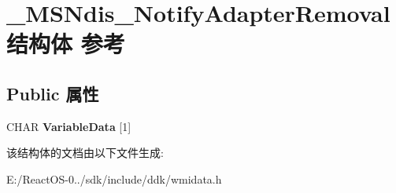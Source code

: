 \hypertarget{struct___m_s_ndis___notify_adapter_removal}{}\section{\+\_\+\+M\+S\+Ndis\+\_\+\+Notify\+Adapter\+Removal结构体 参考}
\label{struct___m_s_ndis___notify_adapter_removal}
\subsection*{Public 属性}
\begin{DoxyCompactItemize}
\item 
\mbox{\label{struct___m_s_ndis___notify_adapter_removal_a6b325f55e8edb812797c90d99340f77b}} 
C\+H\+AR {\bfseries Variable\+Data} \mbox{[}1\mbox{]}
\end{DoxyCompactItemize}


该结构体的文档由以下文件生成\+:\begin{DoxyCompactItemize}
\item 
E\+:/\+React\+O\+S-\/0../sdk/include/ddk/wmidata.\+h\end{DoxyCompactItemize}
